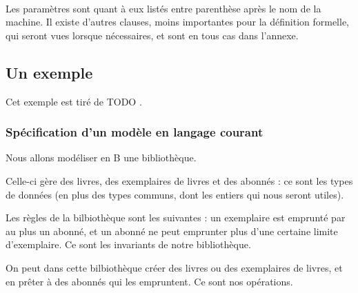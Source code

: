 \documentclass[10pt,a4paper]{article}
\newcommand{\Bequal}{\mathrel{\widehat{=}}}
\begin{document}
\ \\
Les paramètres sont quant à eux listés entre parenthèse après le nom de la machine. Il existe d'autres clauses, moins importantes pour la définition formelle, qui seront vues lorsque nécessaires, et sont en tous cas dans l'annexe.

\subsection{Un exemple}

Cet exemple est tiré de TODO .


\subsubsection{Spécification d'un modèle en langage courant}

Nous allons modéliser en B une bibliothèque.

Celle-ci gère des livres, des exemplaires de livres et des abonnés : ce sont les types de données (en plus des types communs, dont les entiers qui nous seront utiles).

Les règles de la bilbiothèque sont les suivantes : un exemplaire est emprunté par au plus un abonné, et un abonné ne peut emprunter plus d'une certaine limite d'exemplaire. Ce sont les invariants de notre bibliothèque.

On peut dans cette bilbiothèque créer des livres ou des exemplaires de livres, et en prêter à des abonnés qui les empruntent. Ce sont nos opérations.
\end{document}
